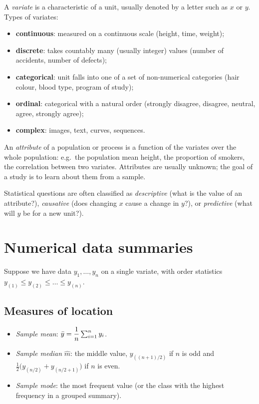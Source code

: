 \begin{definition}[Variates]
A \emph{variate} is a characteristic of a unit, usually denoted by a letter such as
$x$ or $y$. Types of variates:
\begin{itemize}
  \item \textbf{continuous}: measured on a continuous scale (height, time, weight);
  \item \textbf{discrete}: takes countably many (usually integer) values (number of
        accidents, number of defects);
  \item \textbf{categorical}: unit falls into one of a set of non-numerical categories
        (hair colour, blood type, program of study);
  \item \textbf{ordinal}: categorical with a natural order (strongly disagree,
        disagree, neutral, agree, strongly agree);
  \item \textbf{complex}: images, text, curves, sequences.
\end{itemize}
\end{definition}

\begin{definition}[Attribute]
An \emph{attribute} of a population or process is a function of the variates over the
whole population: e.g.\ the population mean height, the proportion of smokers, the
correlation between two variates. Attributes are usually unknown; the goal of a study is
to learn about them from a sample.
\end{definition}

\begin{remark}
Statistical questions are often classified as \emph{descriptive} (what is the value of
an attribute?), \emph{causative} (does changing $x$ cause a change in $y$?), or
\emph{predictive} (what will $y$ be for a new unit?).
\end{remark}

\section{Numerical data summaries}

Suppose we have data $y_1,\dots,y_n$ on a single variate, with order statistics
$y_{(1)} \le y_{(2)} \le \dots \le y_{(n)}$.

\subsection{Measures of location}

\begin{definition}
\begin{itemize}
  \item \emph{Sample mean}: $\bar{y} = \dfrac{1}{n}\sum_{i=1}^n y_i$.
  \item \emph{Sample median} $\hat m$: the middle value, $y_{((n+1)/2)}$ if $n$ is odd and
        $\tfrac12\big(y_{(n/2)} + y_{(n/2+1)}\big)$ if $n$ is even.
  \item \emph{Sample mode}: the most frequent value (or the class with the highest
        frequency in a grouped summary).
\end{itemize}
\end{definition}


